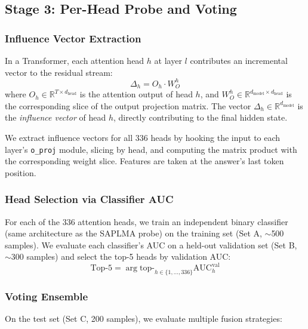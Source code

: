 \documentclass[11pt]{article}
\begin{document}
\subsection{Stage 3: Per-Head Probe and Voting}
\label{sec:headprobe}

\subsubsection{Influence Vector Extraction}

In a Transformer, each attention head $h$ at layer $l$ contributes an incremental vector to the residual stream:
\begin{equation}
    \Delta_h = O_h \cdot W_O^h
\end{equation}
where $O_h \in \mathbb{R}^{T \times d_{\text{head}}}$ is the attention output of head $h$, and $W_O^h \in \mathbb{R}^{d_{\text{model}} \times d_{\text{head}}}$ is the corresponding slice of the output projection matrix. The vector $\Delta_h \in \mathbb{R}^{d_{\text{model}}}$ is the \emph{influence vector} of head $h$, directly contributing to the final hidden state.

We extract influence vectors for all 336 heads by hooking the input to each layer's \texttt{o\_proj} module, slicing by head, and computing the matrix product with the corresponding weight slice. Features are taken at the answer's last token position.

\subsubsection{Head Selection via Classifier AUC}

For each of the 336 attention heads, we train an independent binary classifier (same architecture as the SAPLMA probe) on the training set (Set A, $\sim$500 samples). We evaluate each classifier's AUC on a held-out validation set (Set B, $\sim$300 samples) and select the top-5 heads by validation AUC:
\begin{equation}
    \text{Top-5} = \arg\text{top-}_{h \in \{1,\ldots,336\}} \text{AUC}_h^{\text{val}}
\end{equation}

\subsubsection{Voting Ensemble}

On the test set (Set C, 200 samples), we evaluate multiple fusion strategies:
\end{document}
